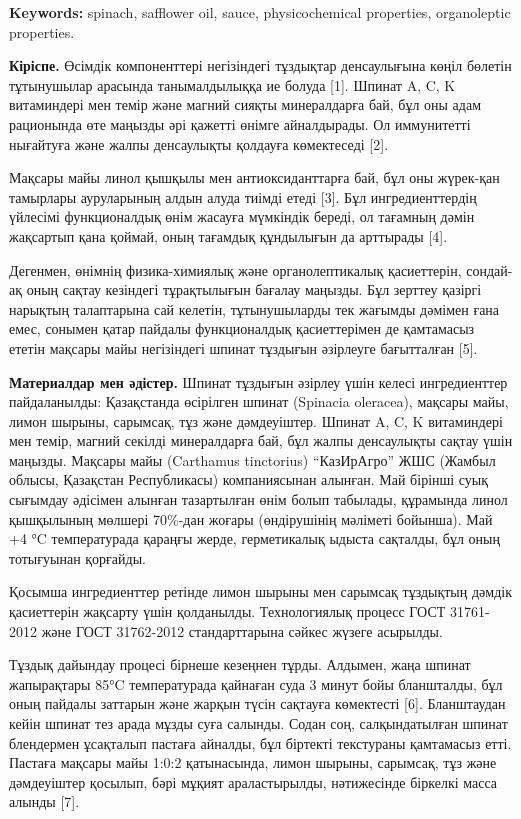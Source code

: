 {{\bfseries Keywords:} spinach, safflower oil, sauce, physicochemical
properties, organoleptic properties.

{\bfseries Кіріспе.} Өсімдік компоненттері негізіндегі тұздықтар
денсаулығына көңіл бөлетін тұтынушылар арасында танымалдылыққа ие болуда
{[}1{]}. Шпинат A, C, K витаминдері мен темір және магний сияқты
минералдарға бай, бұл оны адам рационында өте маңызды әрі қажетті өнімге
айналдырады. Ол иммунитетті нығайтуға және жалпы денсаулықты қолдауға
көмектеседі {[}2{]}.

Мақсары майы линол қышқылы мен антиоксиданттарға бай, бұл оны жүрек-қан
тамырлары ауруларының алдын алуда тиімді етеді {[}3{]}. Бұл
ингредиенттердің үйлесімі функционалдық өнім жасауға мүмкіндік береді,
ол тағамның дәмін жақсартып қана қоймай, оның тағамдық құндылығын да
арттырады {[}4{]}.

Дегенмен, өнімнің физика-химиялық және органолептикалық қасиеттерін,
сондай-ақ оның сақтау кезіндегі тұрақтылығын бағалау маңызды. Бұл
зерттеу қазіргі нарықтың талаптарына сай келетін, тұтынушыларды тек
жағымды дәмімен ғана емес, сонымен қатар пайдалы функционалдық
қасиеттерімен де қамтамасыз ететін мақсары майы негізіндегі шпинат
тұздығын әзірлеуге бағытталған {[}5{]}.

{\bfseries Материалдар мен әдістер.} Шпинат тұздығын әзірлеу үшін келесі
ингредиенттер пайдаланылды: Қазақстанда өсірілген шпинат (Spinacia
oleracea), мақсары майы, лимон шырыны, сарымсақ, тұз және дәмдеуіштер.
Шпинат A, C, K витаминдері мен темір, магний секілді минералдарға бай,
бұл жалпы денсаулықты сақтау үшін маңызды. Мақсары майы (Carthamus
tinctorius) ``КазИрАгро'' ЖШС (Жамбыл облысы, Қазақстан Республикасы)
компаниясынан алынған. Май бірінші суық сығымдау әдісімен алынған
тазартылған өнім болып табылады, құрамында линол қышқылының мөлшері
70\%-дан жоғары (өндірушінің мәліметі бойынша). Май +4 °C температурада
қараңғы жерде, герметикалық ыдыста сақталды, бұл оның тотығуынан
қорғайды.

Қосымша ингредиенттер ретінде лимон шырыны мен сарымсақ тұздықтың дәмдік
қасиеттерін жақсарту үшін қолданылды. Технологиялық процесс ГОСТ
31761-2012 және ГОСТ 31762-2012 стандарттарына сәйкес жүзеге асырылды.

Тұздық дайындау процесі бірнеше кезеңнен тұрды. Алдымен, жаңа шпинат
жапырақтары 85°C температурада қайнаған суда 3 минут бойы бланшталды,
бұл оның пайдалы заттарын және жарқын түсін сақтауға көмектесті {[}6{]}.
Бланштаудан кейін шпинат тез арада мұзды суға салынды. Содан соң,
салқындатылған шпинат блендермен ұсақталып пастаға айналды, бұл біртекті
текстураны қамтамасыз етті. Пастаға мақсары майы 1:0:2 қатынасында,
лимон шырыны, сарымсақ, тұз және дәмдеуіштер қосылып, бәрі мұқият
араластырылды, нәтижесінде біркелкі масса алынды {[}7{]}.

}
